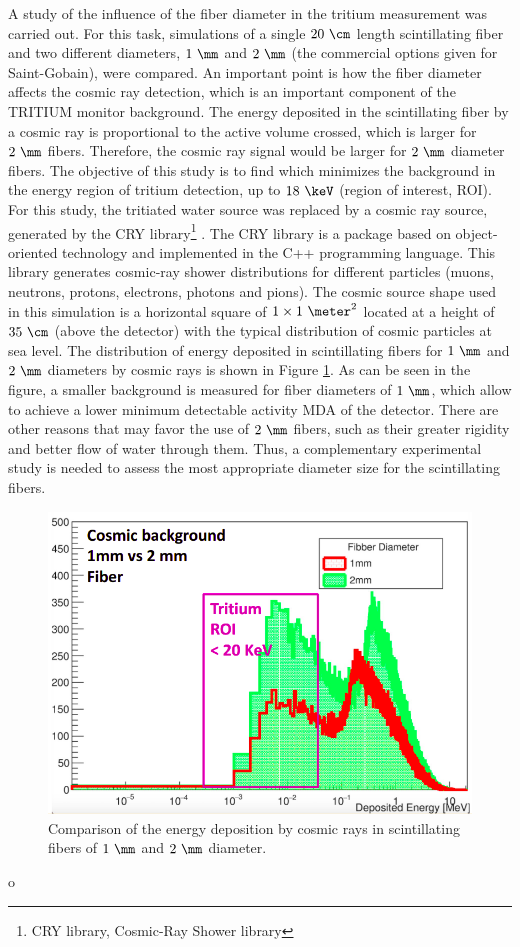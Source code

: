 A study of the influence of the fiber diameter in the tritium measurement was carried out. For this task, simulations of a single $20~\cm$ length scintillating fiber and two different diameters, $1~\mm$ and $2~\mm$ (the commercial options given for Saint-Gobain), were compared. An important point is how the fiber diameter affects the cosmic ray detection, which is an important component of the TRITIUM monitor background. The energy deposited in the scintillating fiber by a cosmic ray is proportional to the active volume crossed, which is larger for $2~\mm$ fibers. Therefore, the cosmic ray signal would be larger for $2~\mm$ diameter fibers. The objective of this study is to find which minimizes the background in the energy region of tritium detection, up to $18~\keV$ (region of interest, ROI). For this study, the tritiated water source was replaced by a cosmic ray source, generated by the CRY library\footnote{CRY library, Cosmic-Ray Shower library} \cite{CRYwebsite, CRYpaper}. The CRY library is a package based on object-oriented technology and implemented in the C++ programming language. This library generates cosmic-ray shower distributions for different particles (muons, neutrons, protons, electrons, photons and pions). The cosmic source shape used in this simulation is a horizontal square of $1 \times 1~\meter ^2$ located at a height of $35~\cm$ (above the detector) with the typical distribution of cosmic particles at sea level. The distribution of energy deposited in scintillating fibers for $1~\mm$ and $2~\mm$ diameters by cosmic rays is shown in Figure \ref{fig:DiameterComparison}. As can be seen in the figure, a smaller background is measured for fiber diameters of $1~\mm$, which allow to achieve a lower minimum detectable activity MDA of the detector. There are other reasons that may favor the use of $2~\mm$ fibers, such as their greater rigidity and better flow of water through them. Thus, a complementary experimental study is needed to assess the most appropriate diameter size for the scintillating fibers.

\begin{figure}[hbtp]
\centering
\includegraphics[scale=0.4]{Figures/8SimulationsResults/81TRITIUMDesign/814Diameter/ComparisonDiameter.png}
\caption{Comparison of the energy deposition by cosmic rays in scintillating fibers of $1~\mm$ and $2~\mm$ diameter.\label{fig:DiameterComparison}}
\end{figure}o